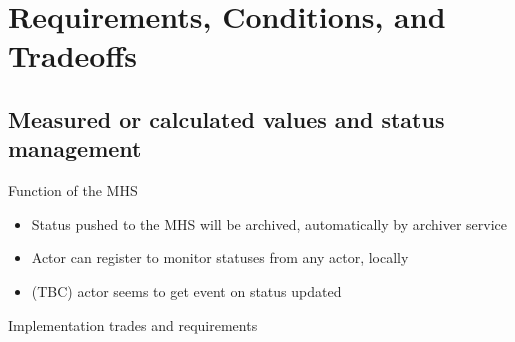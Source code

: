 \documentclass[a4paper,notitlepage]{article}
\begin{document}
\section{Requirements, Conditions, and Tradeoffs}

\subsection{Measured or calculated values and status management}

Function of the MHS
\begin{itemize}
  \item Status pushed to the MHS will be archived, automatically by archiver service
  \item Actor can register to monitor statuses from any actor, locally
  \item (TBC) actor seems to get event on status updated
\end{itemize}

Implementation trades and requirements
\end{document}
